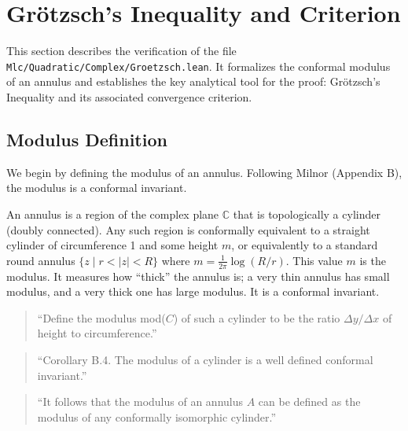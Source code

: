 \section{Grötzsch's Inequality and Criterion}
\label{sec:Groetzsch}

This section describes the verification of the file \texttt{Mlc/Quadratic/Complex/Groetzsch.lean}. It formalizes the conformal modulus of an annulus and establishes the key analytical tool for the proof: Grötzsch's Inequality and its associated convergence criterion.

\subsection{Modulus Definition}

We begin by defining the modulus of an annulus. Following Milnor (Appendix B), the modulus is a conformal invariant.

An annulus is a region of the complex plane $\mathbb{C}$ that is topologically a cylinder (doubly connected). Any such region is conformally equivalent to a straight cylinder of circumference 1 and some height $m$, or equivalently to a standard round annulus $\{z \mid r < |z| < R\}$ where $m = \frac{1}{2\pi} \log(R/r)$. This value $m$ is the modulus. It measures how ``thick'' the annulus is; a very thin annulus has small modulus, and a very thick one has large modulus. It is a conformal invariant.

\begin{quote}
    ``Define the modulus mod($C$) of such a cylinder to be the ratio $\Delta y/\Delta x$ of height to circumference.''\cite{Milnor}
\end{quote}

\begin{quote}
    ``Corollary B.4. The modulus of a cylinder is a well defined conformal invariant.''\cite{Milnor}
\end{quote}

\begin{quote}
    ``It follows that the modulus of an annulus $A$ can be defined as the modulus of any conformally isomorphic cylinder.''\cite{Milnor}
\end{quote}

